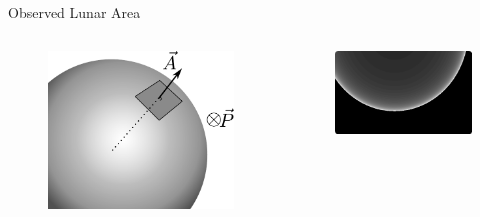 \documentclass[pdf]{beamer}
\begin{document}
 \begin{frame}{Observed Lunar Area}
   \begin{columns}
	 \begin{figure}[ht!]
	   \centering
	   \includegraphics[width=\textwidth]{Images/lunararea1.pdf}
	 \end{figure}
	 \begin{figure}[ht!]
	   \centering
	   \includegraphics[width=\textwidth]{Images/lunararea_example.pdf}
	 \end{figure}
   \end{columns}
 \end{frame}
\end{document}
